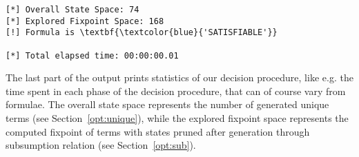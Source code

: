\begin{Verbatim}
[*] Overall State Space: 74
[*] Explored Fixpoint Space: 168
[!] Formula is \textbf{\textcolor{blue}{'SATISFIABLE'}}

[*] Total elapsed time: 00:00:00.01
\end{Verbatim}

The last part of the output prints statistics of our decision procedure, like e.g. the
time spent in each phase of the decision procedure, that can of course vary from formulae.
The overall state space represents the number of generated unique terms 
(see Section~\ref{opt:unique}), while the explored fixpoint space represents the computed
fixpoint of terms with states pruned after generation through subsumption relation 
(see Section~\ref{opt:sub}).
 
%

